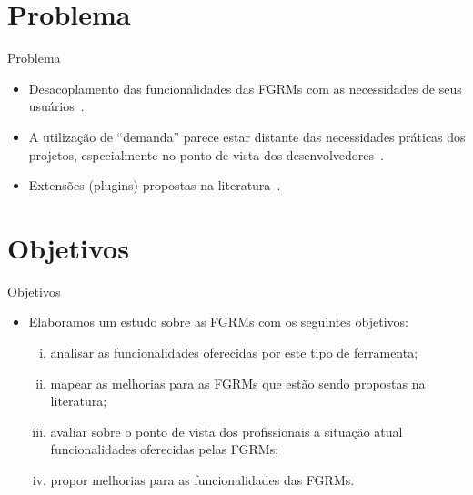 \documentclass[t,14pt,mathserif]{beamer}
\begin{document}
\section{Problema}

\begin{frame}{Problema}
	\begin{itemize}

        \item Desacoplamento das funcionalidades das FGRMs com as necessidades
              de seus usuários~\cite{baysal2012qualitative, just2008towards}.

        \item A utilização de  ``demanda'' parece estar distante das
              necessidades práticas dos projetos, especialmente no ponto de vista
              dos desenvolvedores~\cite{Baysal:2013:SAP:2486788.2486957}.

        \item Extensões (plugins) propostas na
              literatura~\cite{101186,Thung:2014:BIT:2635868.2661678,Kononenko:2014:DED:2591062.2591075}.
	\end{itemize}
\end{frame}
\section{Objetivos}

\begin{frame}{Objetivos}
	\begin{itemize}
        \item Elaboramos um estudo sobre as FGRMs com os seguintes objetivos:
            \begin{enumerate}[(i)]
                \item analisar as funcionalidades oferecidas por este tipo de
                      ferramenta;
                \item mapear as melhorias para as FGRMs que estão sendo
                      propostas na literatura;
                \item avaliar sobre o ponto de vista dos profissionais a
                      situação atual funcionalidades oferecidas pelas FGRMs\@;
                \item propor melhorias para as funcionalidades das FGRMs\@.
            \end{enumerate}
	\end{itemize}
\end{frame}
\end{document}
